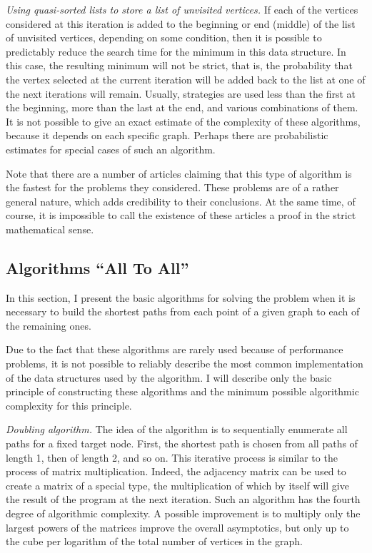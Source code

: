     \textit{Using quasi-sorted lists to store a list of unvisited vertices.}
    If each of the vertices considered at this iteration is added to the beginning or end (middle) of the list of unvisited vertices, depending on some condition, then it is possible to predictably reduce the search time for the minimum in this data structure.
    In this case, the resulting minimum will not be strict, that is, the probability that the vertex selected at the current iteration will be added back to the list at one of the next iterations will remain.
    Usually, strategies are used less than the first at the beginning, more than the last at the end, and various combinations of them.
    It is not possible to give an exact estimate of the complexity of these algorithms, because it depends on each specific graph.
    Perhaps there are probabilistic estimates for special cases of such an algorithm.

    Note that there are a number of articles claiming that this type of algorithm is the fastest for the problems they considered.
    These problems are of a rather general nature, which adds credibility to their conclusions. At the same time, of course, it is impossible to call the existence of these articles a proof in the strict mathematical sense.

    
    \subsection{Algorithms ``All To All''}
    In this section, I present the basic algorithms for solving the problem when it is necessary to build the shortest paths from each point of a given graph to each of the remaining ones.

    Due to the fact that these algorithms are rarely used because of performance problems, it is not possible to reliably describe the most common implementation of the data structures used by the algorithm. I will describe only the basic principle of constructing these algorithms and the minimum possible algorithmic complexity for this principle.

    \textit{Doubling algorithm.}
    The idea of the algorithm is to sequentially enumerate all paths for a fixed target node.
    First, the shortest path is chosen from all paths of length 1, then of length 2, and so on.
    This iterative process is similar to the process of matrix multiplication.
    Indeed, the adjacency matrix can be used to create a matrix of a special type, the multiplication of which by itself will give the result of the program at the next iteration.
    Such an algorithm has the fourth degree of algorithmic complexity.
    A possible improvement is to multiply only the largest powers of the matrices improve the overall asymptotics, but only up to the cube per logarithm of the total number of vertices in the graph.
    
